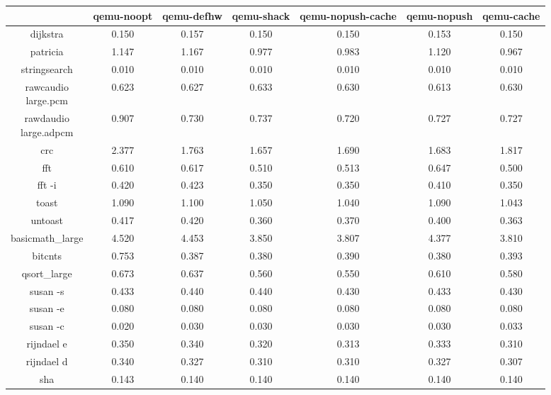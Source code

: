 \documentclass{article}
\begin{document}
\begin{center}
  {\small\begin{tabular}{|c|c|c|c|c|c|c|}
  \hline
     & qemu-noopt & qemu-defhw & qemu-shack
     & qemu-nopush-cache & qemu-nopush & qemu-cache \\
    \hline
    dijkstra & 0.150 & 0.157 & 0.150 & 0.150 & 0.153 & 0.150 \\
    \hline
    patricia & 1.147 & 1.167 & 0.977 & 0.983 & 1.120 & 0.967 \\
    \hline
    stringsearch & 0.010 & 0.010 & 0.010 & 0.010 & 0.010 & 0.010 \\
    \hline
    \parbox{1.5cm}{rawcaudio\\ large.pcm} & 0.623 & 0.627 & 0.633 & 0.630 & 0.613 & 0.630 \\
    \hline
    \parbox{1.5cm}{rawdaudio\\ large.adpcm} & 0.907 & 0.730 & 0.737 & 0.720 & 0.727 & 0.727 \\
    \hline
    crc & 2.377 & 1.763 & 1.657 & 1.690 & 1.683 & 1.817 \\
    \hline
    fft & 0.610 & 0.617 & 0.510 & 0.513 & 0.647 & 0.500 \\
    \hline
    fft -i & 0.420 & 0.423 & 0.350 & 0.350 & 0.410 & 0.350 \\
    \hline
    toast & 1.090 & 1.100 & 1.050 & 1.040 & 1.090 & 1.043 \\
    \hline
    untoast & 0.417 & 0.420 & 0.360 & 0.370 & 0.400 & 0.363 \\
    \hline
    basicmath\_large & 4.520 & 4.453 & 3.850 & 3.807 & 4.377 & 3.810 \\
    \hline
    bitcnts & 0.753 & 0.387 & 0.380 & 0.390 & 0.380 & 0.393 \\
    \hline
    qsort\_large & 0.673 & 0.637 & 0.560 & 0.550 & 0.610 & 0.580 \\
    \hline
    susan -s & 0.433 & 0.440 & 0.440 & 0.430 & 0.433 & 0.430 \\
    \hline
    susan -e & 0.080 & 0.080 & 0.080 & 0.080 & 0.080 & 0.080 \\
    \hline
    susan -c & 0.020 & 0.030 & 0.030 & 0.030 & 0.030 & 0.033 \\
    \hline
    rijndael e & 0.350 & 0.340 & 0.320 & 0.313 & 0.333 & 0.310 \\
    \hline
    rijndael d & 0.340 & 0.327 & 0.310 & 0.310 & 0.327 & 0.307 \\
    \hline
    sha & 0.143 & 0.140 & 0.140 & 0.140 & 0.140 & 0.140 \\

\end{tabular}}
\end{center}
\end{document}
